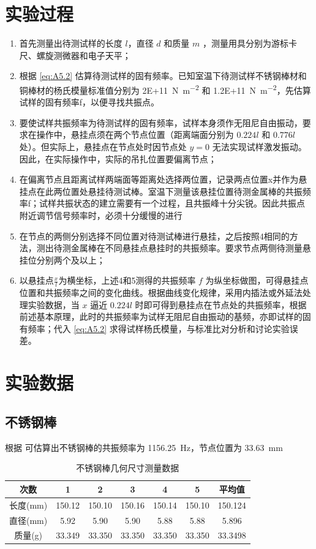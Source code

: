 \section{实验过程}%
    \begin{enumerate}
        \item 首先测量出待测试样的长度 $l$，直径 $d$ 和质量 $m$ ，测量用具分别为游标卡尺、螺旋测微器和电子天平；
        \item 根据 \eqref{eq:A5.2} 估算待测试样的固有频率。已知室温下待测试样不锈钢棒材和铜棒材的杨氏模量标准值分别为 \SI{2E+11}{\N\per\m^2} 和 \SI{1.2E+11}{\N\per\m^2}，先估算试样的固有频率f，以便寻找共振点。
        \item 要使试样共振频率为待测试样的固有频率，试样本身须作无阻尼自由振动，要求在操作中，悬挂点须在两个节点位置（距离端面分别为 $0.224l$ 和 $0.776l$ 处）。但实际上，悬挂点在节点处时因节点处 $y=0$ 无法实现试样激发振动。因此，在实际操作中，实际的吊扎位置要偏离节点；
        \item 在偏离节点且距离试样两端面等距离处选择两位置，记录两点位置x并作为悬挂点在此两位置处悬挂待测试棒。室温下测量该悬挂位置待测金属棒的共振频率f；试样共振状态的建立需要有一个过程，且共振峰十分尖锐。因此共振点附近调节信号频率时，必须十分缓慢的进行
        \item 在节点的两侧分别选择不同位置对待测试棒进行悬挂，之后按照4相同的方法，测出待测金属棒在不同悬挂点悬挂时的共振频率。要求节点两侧待测量悬挂位分别两个及以上；
        \item 以悬挂点$\frac{x}{l}$为横坐标，上述4和5测得的共振频率 $f$ 为纵坐标做图，可得悬挂点位置和共振频率之间的变化曲线。根据曲线变化规律，采用内插法或外延法处理实验数据，当 $x$ 逼近 $0.224l$ 时即可得到悬挂点在节点处的共振频率，根据前述基本原理，此时的共振频率为试样无阻尼自由振动的基频，亦即试样的固有频率；代入 \eqref{eq:A5.2} 求得试样杨氏模量，与标准比对分析和讨论实验误差。 
    \end{enumerate}

\section{实验数据}
\subsection{不锈钢棒}
根据 可估算出不锈钢棒的共振频率为 \SI{1156.25}{\Hz}，节点位置为 \SI{33.63}{\mm}
\begin{table}[!ht]
    \caption{不锈钢棒几何尺寸测量数据}\label{tab:A5.steelSize}
    \begin{tabular}{c *{5}{S[table-format=3.3]} S[table-format=3.4]} \toprule
        次数 & {1} & {2} & {3} & {4} & {5} & {平均值} \\ \midrule
        长度(\unit{\mm}) & 150.12 & 150.10 & 150.16 & 150.14 & 150.10 & 150.124 \\ 
        直径(\unit{\mm}) & 5.92 & 5.90 & 5.90 & 5.88 & 5.88 & 5.896 \\ 
        质量(\unit{\g}) & 33.349 & 33.350 & 33.350 & 33.350 & 33.350 & 33.3498 \\ \bottomrule
    \end{tabular}
\end{table}

